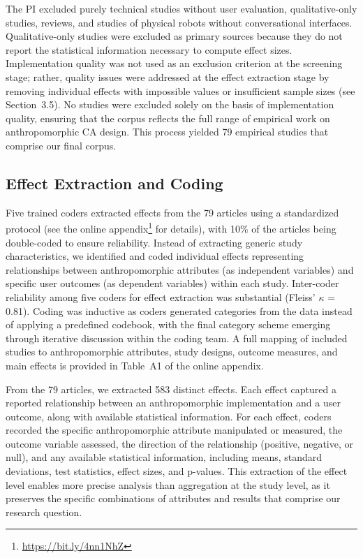 \documentclass[preprint,review,12pt,authoryear,nonatbib]{elsarticle}
\begin{document}
The PI excluded purely technical studies without user evaluation, qualitative-only studies, reviews, and studies of physical robots without conversational interfaces. Qualitative-only studies were excluded as primary sources because they do not report the statistical information necessary to compute effect sizes.  Implementation quality was not used as an exclusion criterion at the screening stage; rather, quality issues were addressed at the effect extraction stage by removing individual effects with impossible values or insufficient sample sizes (see Section~3.5). No studies were excluded solely on the basis of implementation quality, ensuring that the corpus reflects the full range of empirical work on anthropomorphic CA design. This process yielded 79 empirical studies that comprise our final corpus.

\subsection{Effect Extraction and Coding}

Five trained coders extracted effects from the 79 articles using a standardized protocol (see the online appendix\footnote{\href{https://osf.io/7rj6f/overview?view_only=35b327583fee4222b5b336465107580c}{https://bit.ly/4nn1NhZ}} for details), with 10\% of the articles being double-coded to ensure reliability. Instead of extracting generic study characteristics, we identified and coded individual effects representing relationships between anthropomorphic attributes (as independent variables) and specific user outcomes (as dependent variables) within each study. Inter-coder reliability among five coders for effect extraction was substantial (Fleiss' $\kappa$ = 0.81). Coding was inductive as coders generated categories from the data instead of applying a predefined codebook, with the final category scheme emerging through iterative discussion within the coding team. A full mapping of included studies to anthropomorphic attributes, study designs, outcome measures, and main effects is provided in Table~A1 of the online appendix.

From the 79 articles, we extracted 583 distinct effects. Each effect captured a reported relationship between an anthropomorphic implementation and a user outcome, along with available statistical information. For each effect, coders recorded the specific anthropomorphic attribute manipulated or measured, the outcome variable assessed, the direction of the relationship (positive, negative, or null), and any available statistical information, including means, standard deviations, test statistics, effect sizes, and p-values. This extraction of the effect level enables more precise analysis than aggregation at the study level, as it preserves the specific combinations of attributes and results that comprise our research question.
\end{document}
